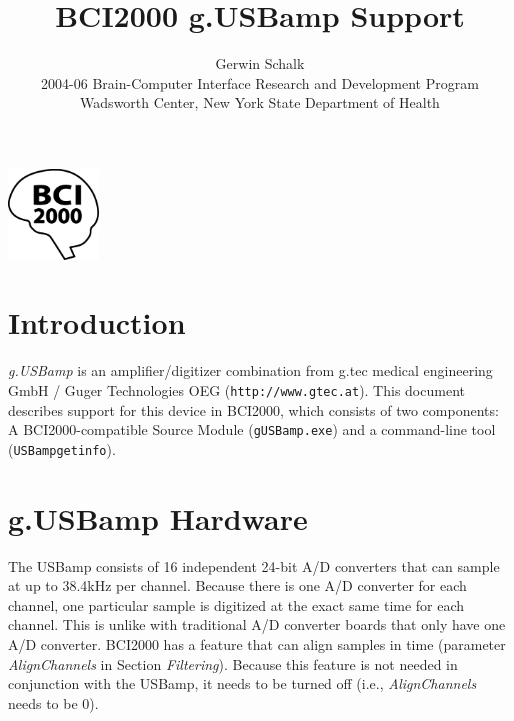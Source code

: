 \documentclass[letterpaper, oneside, 12pt]{article}
\begin{document}
%
\title{BCI2000 g.USBamp Support}
\author{Gerwin Schalk\\ \small{2004-06 Brain-Computer Interface Research and Development Program}\\ \small{Wadsworth Center, New York State Department of Health}}
\maketitle
\centerline{\includegraphics[height=2.4cm,keepaspectratio=true]{BCI2000logo}}


\newpage


\section{Introduction}

\sloppypar \emph{g.USBamp} is an amplifier/digitizer combination from g.tec 
medical engineering GmbH / Guger Technologies OEG (\texttt{http://www.gtec.at}). 
This document describes support for this device in BCI2000, which consists of 
two components: A BCI2000-compatible Source Module (\texttt{gUSBamp.exe}) and a 
command-line tool (\texttt{USBampgetinfo}). 

\section{g.USBamp Hardware}

The USBamp consists of 16 independent 24-bit A/D converters that can sample at 
up to 38.4kHz per channel. Because there is one A/D converter for each channel, 
one particular sample is digitized at the exact same time for each channel. This 
is unlike with traditional A/D converter boards that only have one A/D 
converter. BCI2000 has a feature that can align samples in time (parameter 
\emph{AlignChannels} in Section \emph{Filtering}). Because this feature is not 
needed in conjunction with the USBamp, it needs to be turned off (i.e., 
\emph{AlignChannels} needs to be 0).
\end{document}
